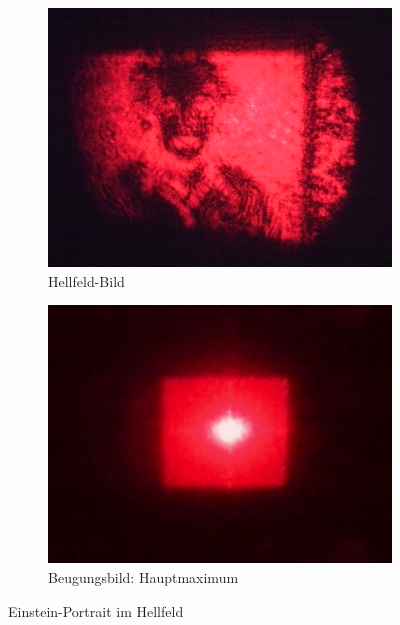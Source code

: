 \begin{figure}[p]
	\centering
	\begin{subfigure}{0.49\textwidth}
		\includegraphics[width=\textwidth]{data/optics/06_Einstein_Hell_Bild}
		\caption{Hellfeld-Bild}
	\end{subfigure}
	\begin{subfigure}{0.49\textwidth}
		\includegraphics[width=\textwidth]{data/optics/06_Einstein_Hell_Beugung}
		\caption{Beugungsbild: Hauptmaximum} 		\label{fig:Einstein_hell_BG}
	\end{subfigure}
	\caption{Einstein-Portrait im Hellfeld}		\label{fig:Einstein_hell}
	\vspace{-1em}
\end{figure}

